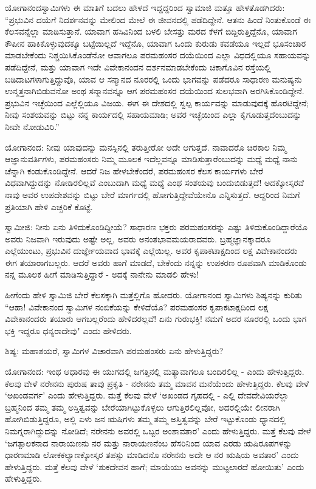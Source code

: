 ಯೋಗಾನಂದಸ್ವಾಮಿಗಳು ಈ ಮಾತಿಗೆ ಬದಲು ಹೇಳದೆ ಇದ್ದದ್ದರಿಂದ ಸ್ವಾಮಾಜಿ ಮತ್ತೂ ಹೇಳತೊಡಗಿದರು: “ಪ್ರಭುವಿನ ದಯೆಗೆ ನಿದರ್ಶನವನ್ನು ಮೇಲಿಂದ ಮೇಲೆ ಈ ಜೀವನದಲ್ಲಿ ಪಡೆದಿದ್ದೇನೆ. ಆತನು ಹಿಂದೆ ನಿಂತುಕೊಂಡೆ ಈ ಕೆಲಸವನ್ನೆಲ್ಲಾ ಮಾಡಿಸುತ್ತಾನೆ. ಯಾವಾಗ ಹಸಿವಿನಿಂದ ಬಳಲಿ ಬೇಸತ್ತು ಮರದ ಕೆಳಗೆ ಬಿದ್ದಿರುತ್ತಿದ್ದೆನೊ, ಯಾವಾಗ ಕೌಪೀನ ಹಾಕಿಕೊಳ್ಳುವುದಕ್ಕೂ ಬಟ್ಟೆಯಿಲ್ಲದೆ ಇದ್ದೆನೊ, ಯಾವಾಗ ಒಂದು ಕುರುಡು ಕವಡೆಯೂ ಇಲ್ಲದೆ ಭೂಸಂಚಾರ ಮಾಡಬೇಕೆಂದು ನಿಶ್ಚಯಿಸಿಕೊಂಡೆನೋ ಆವಾಗಲೂ ಪರಮಹಂಸರ ದಯೆಯಿಂದ ಎಲ್ಲಾ ವಿಧದಲ್ಲಿಯೂ ಸಹಾಯವನ್ನು ಪಡೆದಿದ್ದೇನೆ, ಮತ್ತು ಯಾವಾಗ ಇದೇ ವಿವೇಕಾನಂದನ ದರ್ಶನಮಾಡಬೇಕೆಂದು ಚಿಕಾಗೊವಿನ ರಸ್ತೆಯಲ್ಲಿ ಬಡಿದಾಟಗಳಾಗುತ್ತಿದ್ದುವೊ, ಯಾವ ಆ ಸನ್ಮಾನದ ನೂರರಲ್ಲಿ ಒಂದು ಭಾಗವನ್ನು ಪಡೆದರೂ ಸಾಧಾರಣ ಮನುಷ್ಯನು ಉನ್ಮತ್ತನಾಗಿಬಿಡುವನೋ ಅಂಥ ಸನ್ಮಾನವನ್ನೂ ಆಗ ಪರಮಹಂಸರ ದಯೆಯಿಂದ ಸುಲಭವಾಗಿ ಅರಗಿಸಿಕೊಂಡಿದ್ದೇನೆ. ಪ್ರಭುವಿನ ಇಚ್ಛೆಯಿಂದ ಎಲ್ಲೆಲ್ಲಿಯೂ ವಿಜಯ. ಈಗ ಈ ದೇಶದಲ್ಲಿ ಸ್ವಲ್ಪ ಕಾರ್ಯವನ್ನು ಮಾಡುವುದಕ್ಕೆ ಹೊರಟಿದ್ದೇನೆ; ನೀವು ಸಂಶಯವನ್ನು ಬಿಟ್ಟು ನನ್ನ ಕಾರ್ಯದಲ್ಲಿ ಸಹಾಯಮಾಡಿ; ಅವರ ಇಚ್ಛೆಯಿಂದ ಎಲ್ಲಾ ಕೈಗೂಡುತ್ತದೆಂಬುದನ್ನು ನೀವೇ ನೋಡುವಿರಿ.”

ಯೋಗಾನಂದ: ನೀವು ಯಾವುದನ್ನು ಮನಸ್ಸಿನಲ್ಲಿ ತರುತ್ತೀರೋ ಅದೇ ಆಗುತ್ತದೆ. ನಾವಾದರೊ ಚಿರಕಾಲ ನಿಮ್ಮ ಆಜ್ಞಾನುವರ್ತಿಗಳು, ಪರಮಹಂಸರು ನಿಮ್ಮ ಮೂಲಕ ಇದೆಲ್ಲವನ್ನೂ ಮಾಡಿಸುತ್ತಾರೆಂಬುದನ್ನು ಮಧ್ಯೆ ಮಧ್ಯೆ ನಾನು ಚೆನ್ನಾಗಿ ಕಂಡುಕೊಂಡಿದ್ದೇನೆ. ಆದರೆ ನಿಜ ಹೇಳಬೇಕೆಂದರೆ, ಪರಮಹಂಸರ ಕೆಲಸ ಕಾರ್ಯಗಳು ಬೇರೆ ವಿಧವಾಗಿದ್ದುದನ್ನು ನೋಡಿರಲಿಲ್ಲವೆ ಎಂಬುದಾಗಿ ಮಧ್ಯೆ ಮಧ್ಯೆ ಎಂಥ ಸಂಶಯವು ಬಂದುಬಿಡುತ್ತದೆ! ಅದಕ್ಕೋಸ್ಕರವೆ ನಾವು ಅವರ ಉಪದೇಶವನ್ನು ಬಿಟ್ಟು ಬೇರೆ ಮಾರ್ಗದಲ್ಲಿ ಹೋಗುತ್ತಿದ್ದೇವೆಯೇನೊ ಎನ್ನಿಸುತ್ತದೆ. ಆದ್ದರಿಂದ ನಿಮಗೆ ಪ್ರತಿಯಾಗಿ ಹೇಳಿ ಎಚ್ಚರಿಕೆ ಕೊಟ್ಟೆ.

ಸ್ವಾಮೀಜಿ: ನೀನು ಏನು ತಿಳಿದುಕೊಂಡಿದ್ದೀಯೆ? ಸಾಧಾರಣ ಭಕ್ತರು ಪರಮಹಂಸರನ್ನು ಎಷ್ಟು ತಿಳಿದುಕೊಂಡಿದ್ದಾರೆಯೊ ಅವರು ನಿಜವಾಗಿ ಇರುವುದು ಅಷ್ಟೇ ಅಲ್ಲ, ಅವರು ಅನಂತಭಾವಮಯರಾದವರು. ಬ್ರಹ್ಮಜ್ಞಾನಕ್ಕಾದರೂ ಎಲ್ಲೆಯುಂಟು, ಪ್ರಭುವಿನ ದುರ್ಜ್ಞೇಯವಾದ ಭಾವಕ್ಕೆ ಎಲ್ಲೆಯಿಲ್ಲ. ಅವರ ಕೃಪಾಕಟಾಕ್ಷದಿಂದ ಲಕ್ಷ ವಿವೇಕಾನಂದರು ಈಗ ತಯಾರಾಗಬಲ್ಲರು. ಆದರೆ ಅವರು ಹಾಗೆ ಮಾಡದೆ, ಬೇಕೆಂದು ನನ್ನನ್ನು ಉಪಕರಣ ರೂಪವಾಗಿ ಮಾಡಿಕೊಂಡು ನನ್ನ ಮೂಲಕ ಹೀಗೆ ಮಾಡಿಸುತ್ತಿದ್ದಾರೆ - ಅದಕ್ಕೆ ನಾನೇನು ಮಾಡಲಿ ಹೇಳು!

ಹೀಗೆಂದು ಹೇಳಿ ಸ್ವಾಮಿಜಿ ಬೇರೆ ಕೆಲಸಕ್ಕಾಗಿ ಮತ್ತೆಲ್ಲಿಗೊ ಹೋದರು. ಯೋಗಾನಂದ ಸ್ವಾಮಿಗಳು ಶಿಷ್ಯನನ್ನು ಕುರಿತು “ಆಹಾ! ವಿವೇಕಾನಂದ ಸ್ವಾಮಿಗಳ ನಂಬಿಕೆಯನ್ನು ಕೇಳಿದೆಯೊ? ಪರಮಹಂಸರ ಕೃಪಾಕಟಾಕ್ಷದಿಂದ ಲಕ್ಷ ವಿವೇಕಾನಂದರು ತಯಾರು ಆಗಬಲ್ಲರೆಂದು ಹೇಳಿದರಲ್ಲವೆ! ಏನು ಗುರುಭಕ್ತಿ! ನಮಗೆ ಅದರ ನೂರರಲ್ಲಿ ಒಂದು ಭಾಗ ಭಕ್ತಿ ಇದ್ದರೂ ಧನ್ಯರಾದೇವು" ಎಂದು ಹೇಳಿದರು.

ಶಿಷ್ಯ: ಮಹಾಶಯರೆ, ಸ್ವಾಮಿಗಳ ವಿಚಾರವಾಗಿ ಪರಮಹಂಸರು ಏನು ಹೇಳುತ್ತಿದ್ದರು?

ಯೋಗಾನಂದ: ಇಂಥ ಆಧಾರವು ಈ ಯುಗದಲ್ಲಿ ಜಗತ್ತಿನಲ್ಲಿ ಮತ್ಯಾವಾಗಲೂ ಬಂದಿರಲಿಲ್ಲ - ಎಂದು ಹೇಳುತ್ತಿದ್ದರು. ಕೆಲವು ವೇಳೆ ನರೇನನು ಪುರುಷ ತಾವು ಪ್ರಕೃತಿ - ನರೇನನು ತಮ್ಮ ಮಾವನ ಮನೆಯೆಂದು ಹೇಳುತ್ತಿದ್ದರು. ಕೆಲವು ವೇಳೆ ‘ಅಖಂಡವರ್ಗ’ ಎಂದು ಹೇಳುತ್ತಿದ್ದರು. ಮತ್ತೆ ಕೆಲವು ವೇಳೆ ‘ಅಖಂಡದ ಗೃಹದಲ್ಲಿ - ಎಲ್ಲಿ ದೇವದೇವಿಯರೆಲ್ಲಾ ಬ್ರಹ್ಮನಿಂದ ತಮ್ಮ ತಮ್ಮ ಅಸ್ತಿತ್ವವನ್ನು ಬೇರೆಯಾಗಿಟ್ಟುಕೊಳ್ಳಲು ಆಗುತ್ತಿರಲಿಲ್ಲವೋ, ಅದರಲ್ಲಿಯೇ ಲೀನರಾಗಿ ಹೋಗಿಬಿಡುತ್ತಿದ್ದರೂ, ಅಲ್ಲಿ ಏಳು ಜನ ಋಷಿಗಳು ತಮ್ಮ ತಮ್ಮ ಅಸ್ತಿತ್ವವನ್ನು ಬೇರೆ ಇಟ್ಟುಕೊಂಡು ಧ್ಯಾನದಲ್ಲಿ ನಿಮಗ್ನರಾಗಿದ್ದುದನ್ನು ನೋಡಿದೆ; ನರೇನನು ಅವರಲ್ಲಿ ಒಬ್ಬರ ಅಂಶಾವತಾರ’ ಎಂದು ಹೇಳುತ್ತಿದ್ದರು. ಮತ್ತೆ ಕೆಲವು ವೇಳೆ ‘ಜಗತ್ಪಾಲಕನಾದ ನಾರಾಯಣನು ನರ ಮತ್ತು ನಾರಾಯಣನೆಂಬ ಹೆಸರಿನಿಂದ ಯಾವ ಎರಡು ಋಷಿರೂಪಗಳನ್ನು ಧಾರಣಮಾಡಿ ಲೋಕಕಲ್ಯಾಣಕ್ಕೋಸ್ಕರ ತಪಸ್ಸು ಮಾಡಿದನೊ ನರೇನನು ಅದೇ ಆ ನರ ಋಷಿಯ ಅವತಾರ’ ಎಂದು ಹೇಳುತ್ತಿದ್ದರು. ಮತ್ತೆ ಕೆಲವು ವೇಳೆ ‘ಶುಕದೇವನ ಹಾಗೆ; ಮಾಯೆಯು ಅವನನ್ನು ಮುಟ್ಟಲಾರದೆ ಹೋಯಿತು’ ಎಂದು ಹೇಳುತ್ತಿದ್ದರು.

